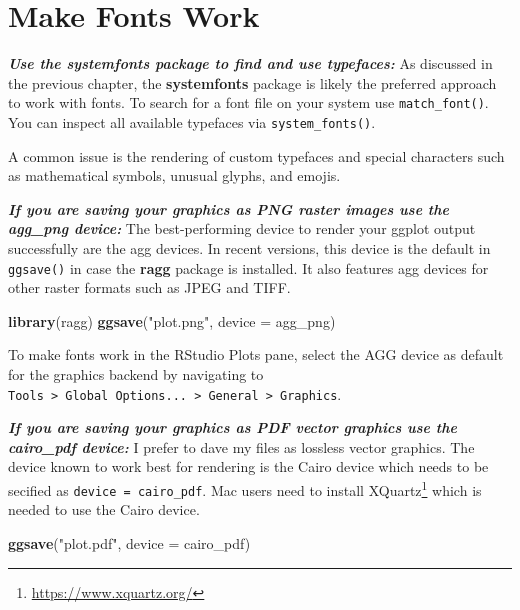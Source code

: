 \documentclass[
]{krantz}
\makeatletter
\newenvironment{Shaded}{\begin{snugshade}}{\end{snugshade}}
\newcommand{\AttributeTok}[1]{\textcolor[rgb]{0.27,0.27,0.27}{#1}}
\newcommand{\FunctionTok}[1]{\textcolor[rgb]{0.27,0.27,0.27}{\textbf{#1}}}
\newcommand{\NormalTok}[1]{#1}
\newcommand{\StringTok}[1]{\textcolor[rgb]{0.5,0.5,0.5}{#1}}
\renewcommand{\href}[2]{#2\footnote{\url{#1}}}
\newenvironment{kframe}{%
\medskip{}
\setlength{\fboxsep}{.8em}
 \def\at@end@of@kframe{}%
 \ifinner\ifhmode%
  \def\at@end@of@kframe{\end{minipage}}%
  \begin{minipage}{\columnwidth}%
 \fi\fi%
 \def\FrameCommand##1{\hskip\@totalleftmargin \hskip-\fboxsep
 \colorbox{shadecolor}{##1}\hskip-\fboxsep
     \hskip-\linewidth \hskip-\@totalleftmargin \hskip\columnwidth}%
 \MakeFramed {\advance\hsize-\width
   \@totalleftmargin\z@ \linewidth\hsize
   \@setminipage}}%
 {\par\unskip\endMakeFramed%
 \at@end@of@kframe}
\renewenvironment{Shaded}{\begin{kframe}}{\end{kframe}}
\makeatother
\begin{document}
\hypertarget{make-fonts-work}{%
\section{Make Fonts Work}\label{make-fonts-work}}

\textbf{\emph{Use the systemfonts package to find and use typefaces:}} As discussed in the previous chapter, the \textbf{systemfonts} package is likely the preferred approach to work with fonts. To search for a font file on your system use \texttt{match\_font()}. You can inspect all available typefaces via \texttt{system\_fonts()}.

A common issue is the rendering of custom typefaces and special characters such as mathematical symbols, unusual glyphs, and emojis.

\textbf{\emph{If you are saving your graphics as PNG raster images use the agg\_png device:}} The best-performing device to render your ggplot output successfully are the agg devices. In recent versions, this device is the default in \texttt{ggsave()} in case the \textbf{ragg} package is installed. It also features agg devices for other raster formats such as JPEG and TIFF.

\begin{Shaded}
\begin{Highlighting}[]
\FunctionTok{library}\NormalTok{(ragg)}
\FunctionTok{ggsave}\NormalTok{(}\StringTok{"plot.png"}\NormalTok{, }\AttributeTok{device =}\NormalTok{ agg\_png)}
\end{Highlighting}
\end{Shaded}

To make fonts work in the RStudio Plots pane, select the AGG device as default for the graphics backend by navigating to \texttt{Tools\ \textgreater{}\ Global\ Options...\ \textgreater{}\ General\ \textgreater{}\ Graphics}.

\textbf{\emph{If you are saving your graphics as PDF vector graphics use the cairo\_pdf device:}} I prefer to dave my files as lossless vector graphics. The device known to work best for rendering is the Cairo device which needs to be secified as \texttt{device\ =\ cairo\_pdf}. Mac users need to install \href{https://www.xquartz.org/}{XQuartz} which is needed to use the Cairo device.

\begin{Shaded}
\begin{Highlighting}[]
\FunctionTok{ggsave}\NormalTok{(}\StringTok{"plot.pdf"}\NormalTok{, }\AttributeTok{device =}\NormalTok{ cairo\_pdf)}
\end{Highlighting}
\end{Shaded}
\end{document}
